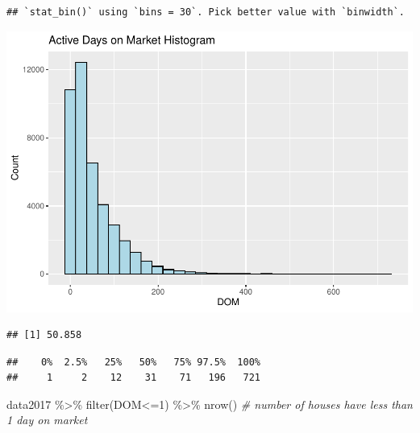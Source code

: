 \documentclass[
]{article}
\newenvironment{Shaded}{\begin{snugshade}}{\end{snugshade}}
\newcommand{\CommentTok}[1]{\textcolor[rgb]{0.56,0.35,0.01}{\textit{#1}}}
\newcommand{\DecValTok}[1]{\textcolor[rgb]{0.00,0.00,0.81}{#1}}
\newcommand{\FloatTok}[1]{\textcolor[rgb]{0.00,0.00,0.81}{#1}}
\newcommand{\FunctionTok}[1]{\textcolor[rgb]{0.00,0.00,0.00}{#1}}
\newcommand{\NormalTok}[1]{#1}
\newcommand{\SpecialCharTok}[1]{\textcolor[rgb]{0.00,0.00,0.00}{#1}}
\begin{document}
\begin{verbatim}
## `stat_bin()` using `bins = 30`. Pick better value with `binwidth`.
\end{verbatim}

\includegraphics{Project_files/figure-latex/unnamed-chunk-13-1.pdf}

\begin{Shaded}
\end{Shaded}

\begin{verbatim}
## [1] 50.858
\end{verbatim}

\begin{Shaded}
\end{Shaded}

\begin{verbatim}
##    0%  2.5%   25%   50%   75% 97.5%  100% 
##     1     2    12    31    71   196   721
\end{verbatim}

\begin{Shaded}
\begin{Highlighting}[]
\NormalTok{data2017 }\SpecialCharTok{\%\textgreater{}\%}
  \FunctionTok{filter}\NormalTok{(DOM}\SpecialCharTok{\textless{}=}\DecValTok{1}\NormalTok{) }\SpecialCharTok{\%\textgreater{}\%}
  \FunctionTok{nrow}\NormalTok{()  }\CommentTok{\# number of houses have less than 1 day on market}
\end{Highlighting}
\end{Shaded}
\end{document}
